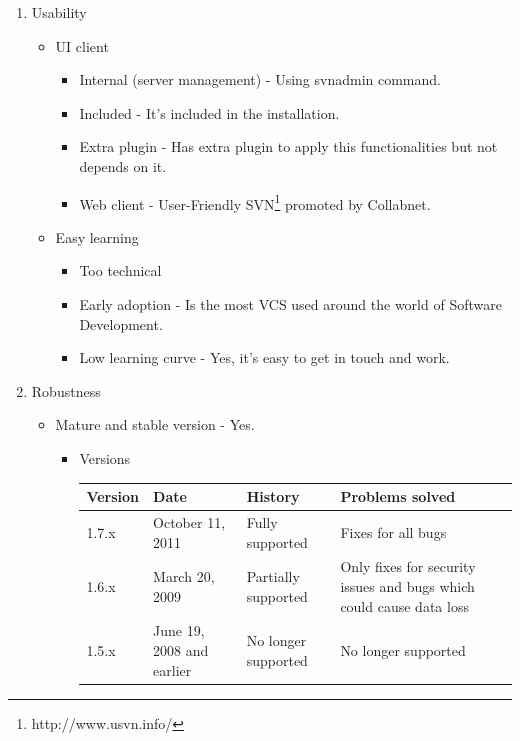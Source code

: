 \documentclass[11pt]{scrartcl}
\begin{document}
\begin{enumerate}
    \item Usability
        \begin{itemize}
	    \item UI client
        	\begin{itemize}
                \item Internal (server management) - Using svnadmin command.
                \item Included - It's included in the installation.
                \item Extra plugin - Has extra plugin to apply this functionalities but not depends on it.
                \item Web client - User-Friendly SVN\footnote{http://www.usvn.info/} promoted by Collabnet.
            \end{itemize}

	    \item Easy learning
        	\begin{itemize}
                \item Too technical 
                \item Early adoption - Is the most VCS used around the world of Software Development.
                \item Low learning curve - Yes, it's easy to get in touch and work.
            \end{itemize}
        \end{itemize}

    \item Robustness

        \begin{itemize}
	    \item Mature and stable version - Yes.
	        \begin{itemize}
            \item Versions

                \begin{tabular}{|l|l|l|l|}
                    \hline
	                    {\bf Version} & {\bf Date} & {\bf History} & {\bf Problems solved}\\
                    \hline
	                    1.7.x & October 11, 2011 & Fully supported & Fixes for all bugs\\
                    \hline
	                    1.6.x & March 20, 2009 & Partially supported & Only fixes for security issues and bugs which could cause data loss\\
                    \hline
	                    1.5.x & June 19, 2008 and earlier & No longer supported & No longer supported\\
                    \hline
                \end{tabular}


\end{itemize}
\end{itemize}
\end{enumerate}
\end{document}
